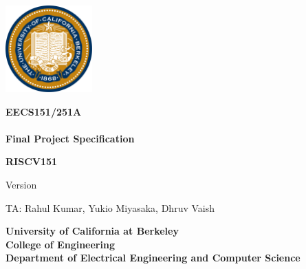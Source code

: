 \hypersetup{pageanchor=false}
\thispagestyle{empty}

\begin{center}
\includegraphics[width=0.25\textwidth]{figs/Seal_of_University_of_California_Berkeley.png}
\end{center}
\begin{center}
\LARGE{
\color{gray}
\bf EECS151/251A \\
\currentSemester \\
Final Project Specification \\
}
\end{center}

\vfill

\begin{center}
\Huge{
\color{berkeleyblue}
\bf RISCV151 \\
}
\end{center}

\vfill

\begin{center}
\LARGE{
\color{gray}
Version \projectSpecVersion \\
}
\end{center}

\vspace{3mm}

\begin{center}
\large{
TA: Rahul Kumar, Yukio Miyasaka, Dhruv Vaish
}
\end{center}
\begin{center}
\large{
\bf University of California at Berkeley \\
College of Engineering \\
Department of Electrical Engineering and Computer Science \\
}
\end{center}

\newpage
\hypersetup{pageanchor=true}
